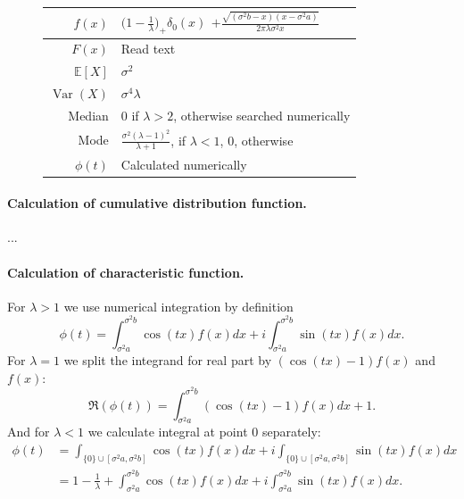 \documentclass[a4paper,11pt]{article}
\theoremstyle{plain}
\theoremstyle{definition}
\newcommand{\ME}{\mathbb{E}}
\newcommand{\Var}{\operatorname{Var}}
\begin{document}
\begin{figure}[!htb]
\begin{minipage}{0.4\textwidth}
\begin{tabular}{| r | l |}
				\hline
				$f(x)$ & $\big(1 - \frac{1}{\lambda} \big)_{+} \delta_0(x)$  $+ \frac{\sqrt{(\sigma^2 b-x)(x-\sigma^2a)}}{2\pi\lambda\sigma^2 x}$  \\
				\hline
				$F(x)$ & Read text \\
				\hline
				$\ME[X]$ & $ \sigma^2 $ \\
				\hline
				$\Var(X)$ & $\sigma^4 \lambda $ \\
				\hline
				Median &
				\pbox{\linewidth}{$0$ if $\lambda > 2$, \\ otherwise searched numerically} \\
				\hline
				Mode & \pbox{\linewidth}{$\frac{\sigma^2(\lambda - 1)^2}{\lambda+1}$, if  $\lambda < 1$, \\  $ 0 $, otherwise } \\
				\hline
				$\phi(t)$ & Calculated numerically \\
				\hline
			\end{tabular}
		\end{minipage}
	\end{figure}
	\paragraph{Calculation of cumulative distribution function.}
	...
	
	\paragraph{Calculation of characteristic function.}
	For $\lambda > 1$ we use numerical integration by definition
	\[
	\phi(t) = \int_{\sigma^2 a}^{\sigma^2 b} \cos(tx) f(x) dx + i \int_{\sigma^2 a}^{\sigma^2 b}  \sin(tx) f(x) dx.
	\]
	For $\lambda = 1$ we split the integrand for real part by $(\cos(tx) - 1) f(x)$ and $f(x)$:
	\[ \Re(\phi(t)) =  \int_{\sigma^2 a}^{\sigma^2 b} (\cos(tx)-1) f(x) dx + 1.\]
	And for $\lambda < 1$ we calculate integral at point $0$ separately:
	\[
	\begin{aligned}
	\phi(t) & = \int_{ \{0\} \cup [\sigma^2 a, \sigma^2 b]} \cos(tx) f(x) dx + i \int_{ \{0\} \cup [\sigma^2 a, \sigma^2 b]} \sin(tx) f(x) dx  \\ 
	& = 1-\frac{1}{\lambda} + \int_{\sigma^2 a}^{\sigma^2 b} \cos(tx) f(x) dx + i \int_{\sigma^2 a}^{\sigma^2 b}  \sin(tx) f(x) dx.
	\end{aligned}
	\]
	
	
	\pagebreak
\end{document}
